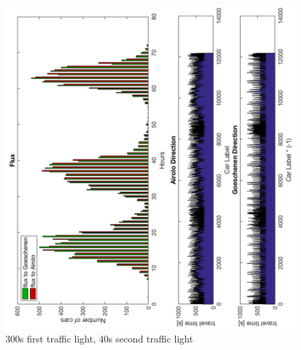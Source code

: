 \documentclass[11pt,a4paper,parskip=half-]{article}
\begin{document}
\begin{figure}[h!]
\includegraphics[scale=0.85]{300_40_3g}
\centering
\vspace*{-4mm}
\caption{300s first traffic light, 40s second traffic light}
\label{fig:300_40_3g}
\end{figure}
\end{document}
